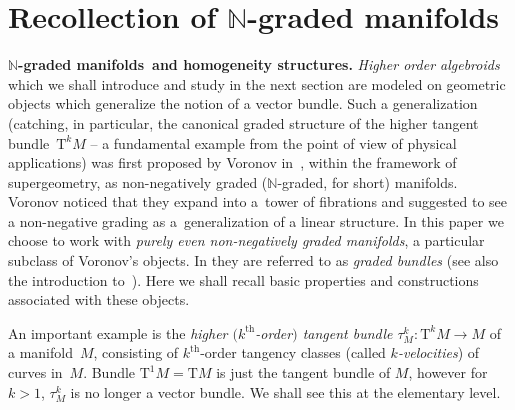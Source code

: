 \documentclass[10pt,a4paper]{amsart}
\newcommand{\grBs}{{$\N$-graded manifolds}}
\newcommand{\thh}[1]{#1^{\mathrm{th}}} %
\newcommand{\N}{\mathbb{N}}
\newcommand{\ra}{\rightarrow}
\newcommand{\T}{\mathrm{T}} %
\newcommand{\TT}[1]{\mathrm{T}^{#1}} %
\numberwithin{equation}{section}
\theoremstyle{definition}
\begin{document}
\section{Recollection of $\N$-graded manifolds}\label{sec:gr_bund}

{\bf \grBs\ and homogeneity structures.} \emph{Higher order algebroids} which we shall introduce and study in the next section are modeled on geometric objects which generalize the notion of a vector bundle. Such a generalization (catching, in particular, the canonical graded structure of the higher tangent bundle~$\TT{k} M$ -- a fundamental example from the point of view of physical applications) was first proposed by Voronov in~\cite{Voronov_2002}, within the framework of supergeometry, as non-negatively graded ($\N$-graded, for short) manifolds. Voronov noticed that they expand into a~tower of fibrations and suggested to see a non-negative grading as a~generalization of a linear structure. In this paper we choose to work with \emph{purely even non-negatively graded manifolds}, a particular subclass of Voronov's objects. In \cite{JG_MR_gr_bund_hgm_str_2011} they are referred to as \emph{graded bundles} (see also the introduction to~\cite{BGR}). Here we shall recall basic properties and constructions associated with these objects.

An important example is the \emph{higher $(\thh{k}$-order$)$ tangent bundle $\tau^k_M\colon \TT{k} M\ra M$} of a mani\-fold~$M$, consisting of $\thh{k}$-order tangency classes (called \emph {$k$-velocities}) of curves in~$M$. Bundle $\TT{1} M=\T M$ is just the tangent bundle of $M$, however for $k>1$, $\tau^k_M$ is no longer a vector bundle. We shall see this at the elementary level.
\end{document}
